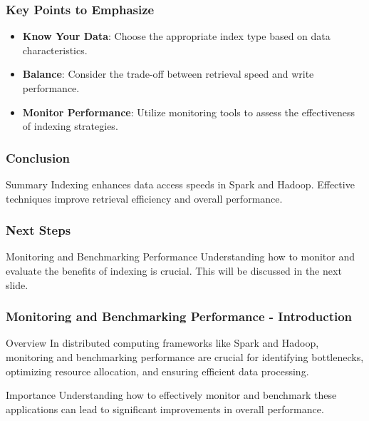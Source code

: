 \documentclass{beamer}
\begin{document}
\begin{frame}[fragile]
    \frametitle{Key Points to Emphasize}
    \begin{itemize}
        \item \textbf{Know Your Data}: Choose the appropriate index type based on data characteristics.
        \item \textbf{Balance}: Consider the trade-off between retrieval speed and write performance.
        \item \textbf{Monitor Performance}: Utilize monitoring tools to assess the effectiveness of indexing strategies.
    \end{itemize}
\end{frame}

\begin{frame}[fragile]
    \frametitle{Conclusion}
    \begin{block}{Summary}
        Indexing enhances data access speeds in Spark and Hadoop. Effective techniques improve retrieval efficiency and overall performance.
    \end{block}
\end{frame}

\begin{frame}[fragile]
    \frametitle{Next Steps}
    \begin{block}{Monitoring and Benchmarking Performance}
        Understanding how to monitor and evaluate the benefits of indexing is crucial. This will be discussed in the next slide.
    \end{block}
\end{frame}

\begin{frame}[fragile]
    \frametitle{Monitoring and Benchmarking Performance - Introduction}
    \begin{block}{Overview}
        In distributed computing frameworks like Spark and Hadoop, monitoring and benchmarking performance are crucial for identifying bottlenecks, optimizing resource allocation, and ensuring efficient data processing.
    \end{block}

    \begin{block}{Importance}
        Understanding how to effectively monitor and benchmark these applications can lead to significant improvements in overall performance.
    \end{block}
\end{frame}
\end{document}
